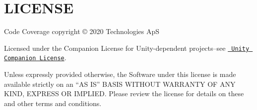 \chapter{LICENSE}
\hypertarget{md__library_2_package_cache_2com_8unity_8testtools_8codecoverage_0d1_82_85_2_l_i_c_e_n_s_e}{}\label{md__library_2_package_cache_2com_8unity_8testtools_8codecoverage_0d1_82_85_2_l_i_c_e_n_s_e}
Code Coverage copyright © 2020  Technologies ApS

Licensed under the  Companion License for Unity-\/dependent projects--see \href{http://www.unity3d.com/legal/licenses/Unity_Companion_License}{\texttt{ Unity Companion License}}.

Unless expressly provided otherwise, the Software under this license is made available strictly on an “\+AS IS” BASIS WITHOUT WARRANTY OF ANY KIND, EXPRESS OR IMPLIED. Please review the license for details on these and other terms and conditions. 